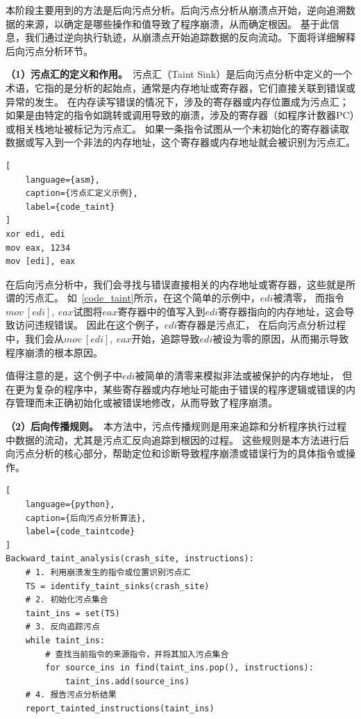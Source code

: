 本阶段主要用到的方法是后向污点分析。后向污点分析从崩溃点开始，逆向追溯数据的来源，以确定是哪些操作和值导致了程序崩溃，从而确定根因。
基于此信息，我们通过逆向执行轨迹，从崩溃点开始追踪数据的反向流动。下面将详细解释后向污点分析环节。

\textbf{（1）污点汇的定义和作用。}\ 
污点汇（Taint Sink）是后向污点分析中定义的一个术语，它指的是分析的起始点，通常是内存地址或寄存器，它们直接关联到错误或异常的发生。
在内存读写错误的情况下，涉及的寄存器或内存位置成为污点汇；
如果是由特定的指令如跳转或调用导致的崩溃，涉及的寄存器（如程序计数器PC）或相关栈地址被标记为污点汇。
如果一条指令试图从一个未初始化的寄存器读取数据或写入到一个非法的内存地址，这个寄存器或内存地址就会被识别为污点汇。

\begin{lstlisting}[
    language={asm},
    caption={污点汇定义示例},
    label={code_taint}
]
xor edi, edi         
mov eax, 1234        
mov [edi], eax      
\end{lstlisting}

在后向污点分析中，我们会寻找与错误直接相关的内存地址或寄存器，这些就是所谓的污点汇。
如~\autoref{code_taint}所示，在这个简单的示例中，$edi$被清零，
而指令$mov\ [edi],\ eax$试图将$eax$寄存器中的值写入到$edi$寄存器指向的内存地址，这会导致访问违规错误。
因此在这个例子，$edi$寄存器是污点汇，
在后向污点分析过程中，我们会从$mov\ [edi],\ eax$开始，追踪导致$edi$被设为零的原因，从而揭示导致程序崩溃的根本原因。

值得注意的是，这个例子中$edi$被简单的清零来模拟非法或被保护的内存地址，
但在更为复杂的程序中，某些寄存器或内存地址可能由于错误的程序逻辑或错误的内存管理而未正确初始化或被错误地修改，从而导致了程序崩溃。

\textbf{（2）后向传播规则。}\ 
本方法中，污点传播规则是用来追踪和分析程序执行过程中数据的流动，尤其是污点汇反向追踪到根因的过程。
这些规则是本方法进行后向污点分析的核心部分，帮助定位和诊断导致程序崩溃或错误行为的具体指令或操作。




\begin{lstlisting}[
    language={python},
    caption={后向污点分析算法},
    label={code_taintcode}
]
Backward_taint_analysis(crash_site, instructions):
    # 1. 利用崩溃发生的指令或位置识别污点汇
    TS = identify_taint_sinks(crash_site)
    # 2. 初始化污点集合
    taint_ins = set(TS)
    # 3. 反向追踪污点
    while taint_ins:
        # 查找当前指令的来源指令，并将其加入污点集合
        for source_ins in find(taint_ins.pop(), instructions):
            taint_ins.add(source_ins)
    # 4. 报告污点分析结果
    report_tainted_instructions(taint_ins)
\end{lstlisting}

